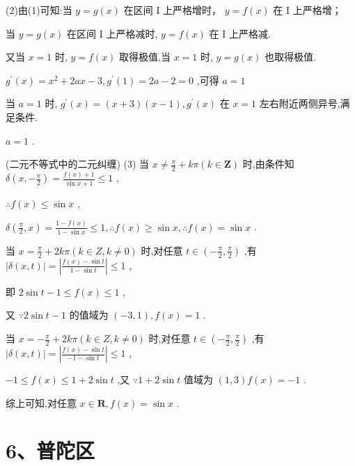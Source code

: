 \documentclass[10pt]{article}
\begin{document}
(2)由(1)可知:当 \(y = g\left( x\right)\) 在区间 \(\mathrm{I}\) 上严格增时， \(y = f\left( x\right)\) 在 \(\mathrm{I}\) 上严格增；

当 \(y = g\left( x\right)\) 在区间 \(\mathrm{I}\) 上严格减时, \(y = f\left( x\right)\) 在 \(\mathrm{I}\) 上严格减.

又当 \(x = 1\) 时, \(y = f\left( x\right)\) 取得极值,当 \(x = 1\) 时, \(y = g\left( x\right)\) 也取得极值.

\({g}^{\prime }\left( x\right)  = {x}^{2} + {2ax} - 3,{g}^{\prime }\left( 1\right)  = {2a} - 2 = 0\) ,可得 \(a = 1\)

当 \(a = 1\) 时, \({g}^{\prime }\left( x\right)  = \left( {x + 3}\right) \left( {x - 1}\right) ,{g}^{\prime }\left( x\right)\) 在 \(x = 1\) 左右附近两侧异号,满足条件.

\(a = 1\) .

(二元不等式中的二元纠缠) (3) 当 \(x \neq  \frac{\pi }{2} + {k\pi }\left( {k \in  \mathbf{Z}}\right)\) 时,由条件知 \(\delta \left( {x, - \frac{\pi }{2}}\right)  = \frac{f\left( x\right)  + 1}{\sin x + 1} \leq  1\) ,

\(\therefore f\left( x\right)  \leq  \sin x\) ,

\(\delta \left( {\frac{\pi }{2},x}\right)  = \frac{1 - f\left( x\right) }{1 - \sin x} \leq  1,\therefore f\left( x\right)  \geq  \sin x,\therefore f\left( x\right)  = \sin x\) .

当 \(x = \frac{\pi }{2} + {2k\pi }\left( {k \in  Z,k \neq  0}\right)\) 时,对任意 \(t \in  \left( {-\frac{\pi }{2},\frac{\pi }{2}}\right)\) ,有 \(\left| {\delta \left( {x,t}\right) }\right|  = \left| \frac{f\left( x\right)  - \sin t}{1 - \sin t}\right|  \leq  1\) ,

即 \(2\sin t - 1 \leq  f\left( x\right)  \leq  1\) ,

又 \(\because 2\sin t - 1\) 的值域为 \(\left( {-3,1}\right) ,f\left( x\right)  = 1\) .

当 \(x =  - \frac{\pi }{2} + {2k\pi }\left( {k \in  Z,k \neq  0}\right)\) 时,对任意 \(t \in  \left( {-\frac{\pi }{2},\frac{\pi }{2}}\right)\) ,有 \(\left| {\delta \left( {x,t}\right) }\right|  = \left| \frac{f\left( x\right)  - \sin t}{-1 - \sin t}\right|  \leq  1\) ,

\(- 1 \leq  f\left( x\right)  \leq  1 + 2\sin t\) ,又 \(\because 1 + 2\sin t\) 值域为 \(\left( {1,3}\right) f\left( x\right)  =  - 1\) .

综上可知,对任意 \(x \in  \mathbf{R},f\left( x\right)  = \sin x\) .

\section*{6、普陀区}
\end{document}
